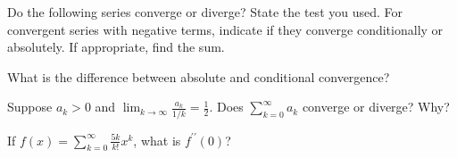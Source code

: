 \documentclass[12pt]{exam}
\begin{document}
\begin{questions}

\vspace{.1in}

\question Do the following series converge or diverge?  State the 
test you used.  For convergent series with negative terms, indicate if they
 converge conditionally or absolutely.  If appropriate,
find the sum.


\question
 What is the difference between absolute and conditional convergence?

\question Suppose $a_k>0$ and $\displaystyle 
\lim_{k\to\infty}\frac{a_k}{1/k} =\frac {1}{2}$.  Does 
$\displaystyle \sum_{k=0}^\infty
a_k$ converge or diverge?  Why?


\question If $\displaystyle
f(x)=\sum_{k=0}^\infty \frac{5k}{k!} x^k$, what is $f^{\prime\prime}(0)$?



\end{questions}
\end{document}
